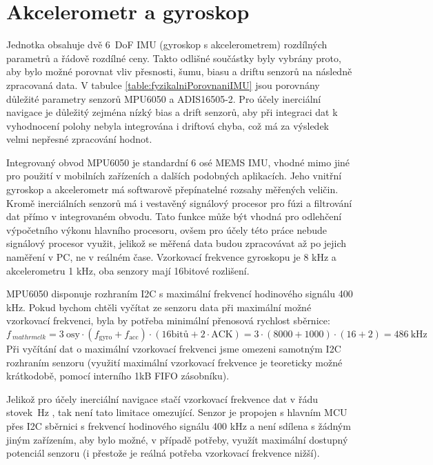 \section{Akcelerometr a gyroskop} \label{AccGyroText}
Jednotka obsahuje dvě 6~\ac{DoF} \ac{IMU} (gyroskop s akcelerometrem) rozdílných parametrů a řádově rozdílné ceny. Takto odlišné součástky byly vybrány proto, aby bylo možné porovnat vliv přesnosti, šumu, biasu a driftu senzorů na následně zpracovaná data.
V tabulce \ref{table:fyzikalniPorovnaniIMU} jsou porovnány důležité parametry senzorů MPU6050 a ADIS16505-2. Pro účely inerciální navigace je důležitý zejména nízký bias a drift senzorů, aby při integraci dat k vyhodnocení polohy nebyla integrována i driftová chyba, což má za výsledek velmi nepřesné zpracování hodnot. \cite{Blocher2021322}



Integrovaný obvod MPU6050 je standardní 6 osé \ac{MEMS} \ac{IMU}, vhodné mimo jiné pro použití v mobilních zařízeních a dalších podobných aplikacích. Jeho vnitřní gyroskop a akcelerometr má softwarově přepínatelné rozsahy měřených veličin. Kromě inerciálních senzorů má i vestavěný signálový procesor pro fúzi a filtrování dat přímo v integrovaném obvodu. Tato funkce může být vhodná pro odlehčení výpočetního výkonu hlavního procesoru, ovšem pro účely této práce nebude signálový procesor využit, jelikož se měřená data budou zpracovávat až po jejich naměření v PC, ne v reálném čase. Vzorkovací frekvence gyroskopu je 8 kHz a akcelerometru 1 kHz, oba senzory mají 16bitové rozlišení.
\cite{euxR3Yh5ol4JWNAi}

MPU6050 disponuje rozhraním \ac{I2C} s maximální frekvencí hodinového signálu 400 kHz. \cite{euxR3Yh5ol4JWNAi}
Pokud bychom chtěli vyčítat ze senzoru data při maximální možné vzorkovací frekvenci, byla by potřeba minimální přenosová rychlost sběrnice:
\begin{equation}
f_{\
mathrm{clk}}=3~\mathrm{osy} \cdot(f_{\mathrm{gyro}} + f_{\mathrm{acc}})\cdot (\mathrm{16bitů} + 2 \cdot \mathrm{ACK})=3\cdot(8000+1000)\cdot(16+2)=\SI{486}{\kilo\hertz}
\end{equation}
Při vyčítání dat o maximální vzorkovací frekvenci jsme omezeni samotným \ac{I2C} rozhraním senzoru (využití maximální vzorkovací frekvence je teoreticky možné krátkodobě, pomocí interního 1kB FIFO zásobníku).\cite{euxR3Yh5ol4JWNAi}

Jelikož pro účely inerciální navigace stačí vzorkovací frekvence dat v  řádu stovek~Hz \cite{Wei2022}, tak není tato limitace omezující. Senzor je propojen s hlavním \ac{MCU} přes \ac{I2C} sběrnici s frekvencí hodinového signálu 400 kHz a není sdílena s žádným jiným zařízením, aby bylo možné, v případě potřeby, využít maximální dostupný potenciál senzoru (i přestože je reálná potřeba vzorkovací frekvence nižší).

